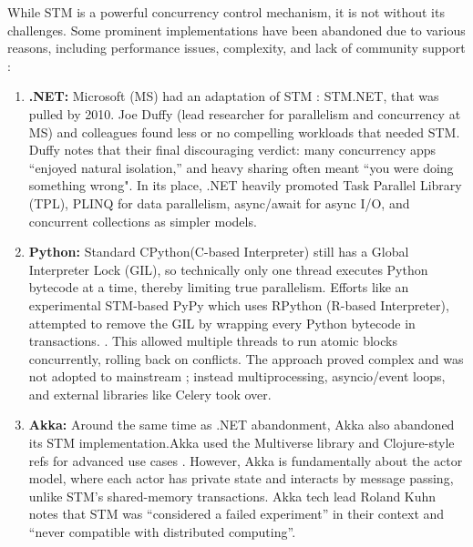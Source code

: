 While STM is a powerful concurrency control mechanism, it is not without its challenges. Some prominent implementations have been abandoned due to various reasons, including performance issues, complexity, and lack of community support :
\begin{enumerate}
    \item \textbf{.NET:}  Microsoft (MS) had an adaptation of STM :  STM.NET, that was pulled by 2010. Joe Duffy (lead researcher for parallelism and concurrency at MS) and colleagues found less or no compelling workloads that needed STM. Duffy notes that their final discouraging verdict: many concurrency apps “enjoyed natural isolation,” and heavy sharing often meant “you were doing something wrong"\cite{infoq.com}.  In its place, .NET heavily promoted Task Parallel Library (TPL), PLINQ for data parallelism, async/await for async I/O, and concurrent collections as simpler models.
    \item \textbf{Python:}  Standard CPython(C-based Interpreter) still has a Global Interpreter Lock (GIL), so technically only one thread executes Python bytecode at a time, thereby limiting true parallelism. Efforts like an experimental STM-based PyPy which uses RPython (R-based Interpreter), attempted to remove the GIL by wrapping every Python bytecode in transactions. \cite{pypy.org}. This allowed multiple threads to run atomic blocks concurrently, rolling back on conflicts. The approach proved complex and was not adopted to mainstream ; instead multiprocessing, asyncio/event loops, and external libraries like Celery took over.
    \item \textbf{Akka:} Around the same time as .NET abandonment, Akka also abandoned its STM implementation.Akka used the Multiverse library and Clojure-style refs for advanced use cases
    \cite{doc.akka.io}. However, Akka is fundamentally about the actor model, where each actor has private state and interacts by message passing, unlike STM’s shared-memory transactions. Akka tech lead Roland Kuhn notes that STM was “considered a failed experiment” in their context and “never compatible with distributed computing”.
\end{enumerate}
